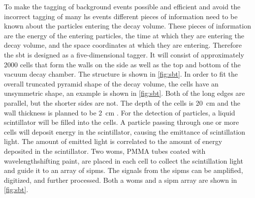 To make the tagging of background events possible and efficient and avoid the incorrect tagging of many \ac{hs} events different pieces of information need to be known about the particles entering the decay volume.
These pieces of information are the energy of the entering particles, the time at which they are entering the decay volume, and the space coordinates at which they are entering.
Therefore the \ac{sbt} is designed as a five-dimensional tagger.
It will consist of approximately 2000 cells that form the walls on the side as well as the top and bottom of the vacuum decay chamber.
The structure is shown in \autoref{fig:sbt}.
In order to fit the overall truncated pyramid shape of the decay volume, the cells have an unsymmetric shape, an example is shown in \autoref{fig:sbt}.
Both of the long edges are parallel, but the shorter sides are not.
The depth of the cells is \SI{20}{\centi\meter} and the wall thickness is planned to be \SI{2}{\centi\meter} \cite{}.
For the detection of particles, a liquid scintillator will be filled into the cells.
A particle passing through one or more cells will deposit energy in the scintillator, causing the emittance of scintillation light.
The amount of emitted light is correlated to the amount of energy deposited in the scintillator.
Two \acp{wom}, PMMA tubes coated with wavelengthshifting paint, are placed in each cell to collect the scintillation light and guide it to an array of \acp{sipm}.
The signals from the \acp{sipm} can be amplified, digitized, and further processed.
Both a \acp{wom} and a \ac{sipm} array are shown in \autoref{fig:sbt}.
